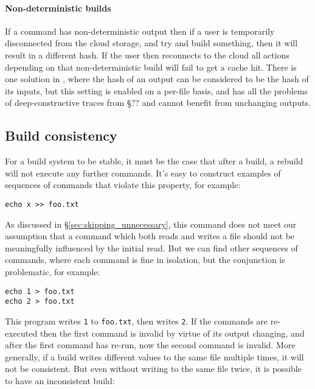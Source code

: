 \paragraph{Non-deterministic builds} If a command has non-deterministic output then if a user is temporarily disconnected from the cloud storage, and try and build something, then it will result in a different hash. If the user then reconnects to the cloud all actions depending on that non-deterministic build will fail to get a cache hit. There is one solution in \Rattle, where the hash of an output can be considered to be the hash of its inputs, but this setting is enabled on a per-file basis, and has all the problems of deep-constructive traces from \cite{build_systems_a_la_carte} \S?? and cannot benefit from unchanging outputs.

\subsection{Build consistency}
\label{sec:hazards}

For a \Make build system to be stable, it must be the case that after a build, a rebuild will not execute any further commands. It's easy to construct examples of sequences of commands that violate this property, for example:

\begin{verbatim}
echo x >> foo.txt
\end{verbatim}



As discussed in \S\ref{sec:skipping_unnecessary}, this command does not meet our assumption that a command which both reads and writes a file should not be meaningfully influenced by the initial read. But we can find other sequences of commands, where each command is fine in isolation, but the conjunction is problematic, for example:

\begin{verbatim}
echo 1 > foo.txt
echo 2 > foo.txt
\end{verbatim}

This program writes \texttt{1} to \texttt{foo.txt}, then writes \texttt{2}. If the commands are re-executed then the first command is invalid by virtue of its output changing, and after the first command has re-run, now the second command is invalid. More generally, if a build writes different values to the same file multiple times, it will not be consistent. But even without writing to the same file twice, it is possible to have an inconsistent build:

